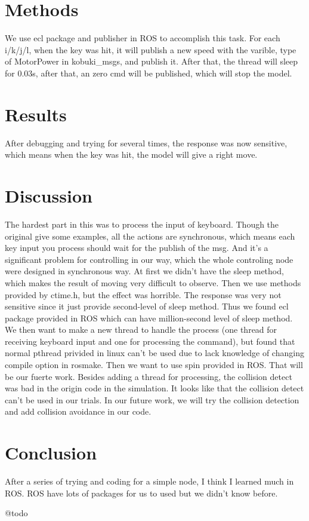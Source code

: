 \documentclass[preprint,pre,floats,aps,amsmath,amssymb]{revtex4}
\begin{document}
\section{Methods}
\label{sec:methods}

We use ecl package and publisher in ROS to accomplish this task. For each i/k/j/l, when the key was hit, it will publish a new speed with the varible, type of MotorPower in kobuki\_msgs, and publish it. After that, the thread will sleep for 0.03s, after that, an zero cmd will be published, which will stop the model.

\section{Results}
\label{sec:results}

After debugging and trying for several times, the response was now sensitive, which means when the key was hit, the model will give a right move.

\section{Discussion}
\label{sec:discussion}

The hardest part in this was to process the input of keyboard. Though the original give some examples, all the actions are synchronous, which means each key input you process should wait for the publish of the msg. And it's a significant problem for controlling in our way, which the whole controling node were designed in synchronous way. At first we didn't have the sleep method, which makes the result of moving very difficult to observe. Then we use methods provided by ctime.h, but the effect was horrible. The response was very not sensitive since it just provide second-level of sleep method. Thus we found ecl package provided in ROS which can have million-second level of sleep method. We then want to make a new thread to handle the process (one thread for receiving keyboard input and one for processing the command), but found that normal pthread privided in linux can't be used due to lack knowledge of changing compile option in rosmake. Then we want to use spin provided in ROS. That will be our fuerte work. Besides adding a thread for processing, the collision detect was bad in the origin code in the simulation. It looks like that the collision detect can't be used in our trials. In our future work, we will try the collision detection and add collision avoidance in our code.

\section{Conclusion}
\label{sec:conclusion}

After a series of trying and coding for a simple node, I think I learned much in ROS. ROS have lots of packages for us to used but we didn't know before.

\begin{acknowledgments}
@todo
\end{acknowledgments}
\end{document}
